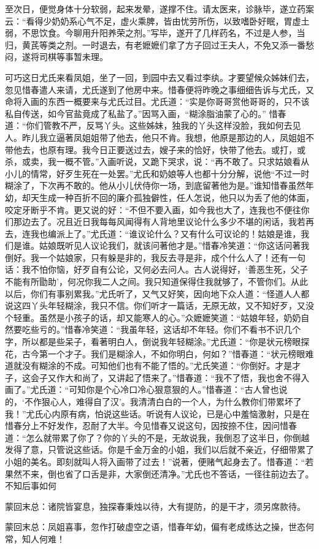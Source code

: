 \begin{parag}
    至次日，便觉身体十分软弱，起来发晕，遂撑不住。请太医来，诊脉毕，遂立药案云：“看得少奶奶系心气不足，虚火乘脾，皆由忧劳所伤，以致嗜卧好眠，胃虚土弱，不思饮食。今聊用升阳养荣之剂。”写毕，遂开了几样药名，不过是人参，当归，黄芪等类之剂。一时退去，有老嬷嬷们拿了方子回过王夫人，不免又添一番愁闷，遂将司棋等事暂未理。
\end{parag}


\begin{parag}
    可巧这日尤氏来看凤姐，坐了一回，到园中去又看过李纨。才要望候众姊妹们去，忽见惜春遣人来请，尤氏遂到了他房中来。惜春便将昨晚之事细细告诉与尤氏，又命将入画的东西一概要来与尤氏过目。尤氏道：“实是你哥哥赏他哥哥的，只不该私自传送，如今官盐竟成了私盐了。”因骂入画，“糊涂脂油蒙了心的。” 惜春道：“你们管教不严，反骂丫头。这些姊妹，独我的丫头这样没脸，我如何去见人。昨儿我立逼著凤姐姐带了他去，他只不肯。我想，他原是那边的人，凤姐姐不带他去，也原有理。我今日正要送过去，嫂子来的恰好，快带了他去。或打，或杀，或卖，我一概不管。”入画听说，又跪下哭求，说：“再不敢了。只求姑娘看从小儿的情常，好歹生死在一处罢。”尤氏和奶娘等人也都十分分解，说他“不过一时糊涂了，下次再不敢的。他从小儿伏侍你一场，到底留著他为是。”谁知惜春虽然年幼，却天生成一种百折不回的廉介孤独僻性，任人怎说，他只以为丢了他的体面，咬定牙断乎不肯。更又说的好：“不但不要入画，如今我也大了，连我也不便往你们那边去了。况且近日我每每风闻得有人背地里议论什么多少不堪的闲话，我若再去，连我也编派上了。”尤氏道：“谁议论什么？又有什么可议论的！姑娘是谁，我们是谁。姑娘既听见人议论我们，就该问著他才是。”惜春冷笑道：“你这话问著我倒好。我一个姑娘家，只有躲是非的，我反去寻是非，成个什么人了！还有一句话：我不怕你恼，好歹自有公论，又何必去问人。古人说得好，‘善恶生死，父子不能有所勖助’，何况你我二人之间。我只知道保得住我就够了，不管你们。从此以后，你们有事别累我。”尤氏听了，又气又好笑，因向地下众人道：“怪道人人都说这四丫头年轻糊涂，我只不信。你们听才一篇话，无原无故，又不知好歹，又没个轻重。虽然是小孩子的话，却又能寒人的心。”众嬷嬷笑道：“姑娘年轻，奶奶自然要吃些亏的。”惜春冷笑道：“我虽年轻，这话却不年轻。你们不看书不识几个字，所以都是些呆子，看著明白人，倒说我年轻糊涂。”尤氏道：“你是状元榜眼探花，古今第一个才子。我们是糊涂人，不如你明白，何如？”惜春道：“状元榜眼难道就没有糊涂的不成。可知他们也有不能了悟的。”尤氏笑道：“你倒好。才是才子，这会子又作大和尚了，又讲起了悟来了。”惜春道：“我不了悟，我也舍不得入画了。”尤氏道：“可知你是个心冷口冷心狠意狠的人。”惜春道：“古人曾也说的，‘不作狠心人，难得自了汉’。我清清白白的一个人，为什么教你们带累坏了我！”尤氏心内原有病，怕说这些话。听说有人议论，已是心中羞恼激射，只是在惜春分上不好发作，忍耐了大半。今见惜春又说这句，因按捺不住，因问惜春道：“怎么就带累了你了？你的丫头的不是，无故说我，我倒忍了这半日，你倒越发得了意，只管说这些话。你是千金万金的小姐，我们以后就不亲近，仔细带累了小姐的美名。即刻就叫人将入画带了过去！”说著，便赌气起身去了。惜春道：“若果然不来，倒也省了口舌是非，大家倒还清净。”尤氏也不答话，一径往前边去了。不知后事如何
\end{parag}


\begin{parag}
    \begin{note}蒙回末总：诸院皆宴息，独探春秉烛以待，大有提防，的是干才，须另席款待。\end{note}
\end{parag}


\begin{parag}
    \begin{note}蒙回末总：凤姐喜事，忽作打破虚空之语，惜春年幼，偏有老成练达之操，世态何常，知人何难！\end{note}
\end{parag}
